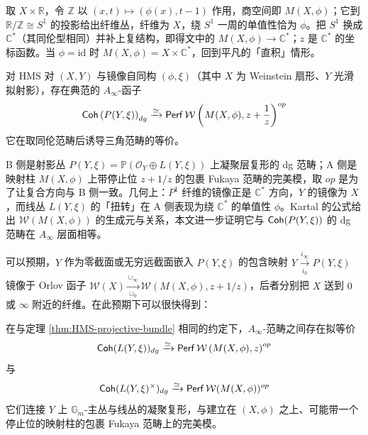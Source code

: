 \begin{yizhu}
取 $X\times\mathbb{R}$，令 $\mathbb{Z}$ 以 $(x,t)\mapsto(\phi(x),t-1)$ 作用，商空间即 $M(X,\phi)$；它到 $\mathbb{R}/\mathbb{Z}\cong S^1$ 的投影给出纤维丛，纤维为 $X$，绕 $S^1$ 一周的单值性恰为 $\phi$。把 $S^1$ 换成 $\mathbb{C}^{\ast}$（其同伦型相同）并补上复结构，即得文中的 $M(X,\phi)\to\mathbb{C}^{\ast}$；$z$ 是 $\mathbb{C}^{\ast}$ 的坐标函数。当 $\phi=\mathrm{id}$ 时 $M(X,\phi)=X\times\mathbb{C}^{\ast}$，回到平凡的「直积」情形。
\end{yizhu}

\begin{thm}\label{thm:HMS-projective-bundle}
    对 HMS 对 $(X,Y)$ 与镜像自同构 $(\phi,\xi)$（其中 $X$ 为 Weinstein 扇形、$Y$ 光滑拟射影），存在典范的 $A_{\infty}$-函子
\[
        \operatorname{\mathsf{Coh}}\left(P(Y,\xi)\right)_{dg}\xrightarrow{\simeq}\operatorname{\mathsf{Perf}}\mathcal{W}\left(M(X,\phi),z+\dfrac{1}{z}\right)^{op}
    \]
    它在取同伦范畴后诱导三角范畴的等价。
\end{thm}

\begin{yizhu}
B 侧是射影丛 $P(Y,\xi)=\mathbb{P}(\mathcal{O}_Y\oplus L(Y,\xi))$ 上凝聚层复形的 dg 范畴；A 侧是映射柱 $M(X,\phi)$ 上带停止位 $z+1/z$ 的包裹 Fukaya 范畴的完美模，取 $op$ 是为了让复合方向与 B 侧一致。几何上：$P^1$ 纤维的镜像正是 $\mathbb{C}^{\ast}$ 方向，$Y$ 的镜像为 $X$，而线丛 $L(Y,\xi)$ 的「扭转」在 A 侧表现为绕 $\mathbb{C}^{\ast}$ 的单值性 $\phi$。Kartal 的公式给出 $\mathcal{W}(M(X,\phi))$ 的生成元与关系，本文进一步证明它与 $\operatorname{\mathsf{Coh}}(P(Y,\xi))$ 的 dg 范畴在 $A_{\infty}$ 层面相等。
\end{yizhu}

可以预期，$Y$ 作为零截面或无穷远截面嵌入 $P(Y,\xi)$ 的包含映射 $Y\xrightarrow[i_0]{i_{\infty}} P(Y,\xi)$ 镜像于 Orlov 函子 $\mathcal{W} (X)\xrightarrow[\cup_0]{\cup_{\infty}}\mathcal{W} (M(X,\phi),z+1/z)$，后者分别把 $X$ 送到 $0$ 或 $\infty$ 附近的纤维。在此预期下可以很快得到：

\begin{crl}\label{crl:mirror-symmetry-line-principal-bundles}
    在与定理 \ref{thm:HMS-projective-bundle} 相同的约定下，$A_{\infty}$-范畴之间存在拟等价
\[
        \operatorname{\mathsf{Coh}} (L(Y,\xi))_{dg}\xrightarrow{\simeq}\operatorname{\mathsf{Perf}}\mathcal{W}\left(M(X,\phi),z\right)^{op}
    \]
    与
\[
        \operatorname{\mathsf{Coh}} (L(Y,\xi)^{\times})_{dg}\xrightarrow{\simeq}\operatorname{\mathsf{Perf}}\mathcal{W} (M(X,\phi))^{op}
        \]
    它们连接 $Y$ 上 $\mathbb{G}_m$-主丛与线丛的凝聚复形，与建立在 $(X,\phi)$ 之上、可能带一个停止位的映射柱的包裹 Fukaya 范畴上的完美模。
\end{crl}

